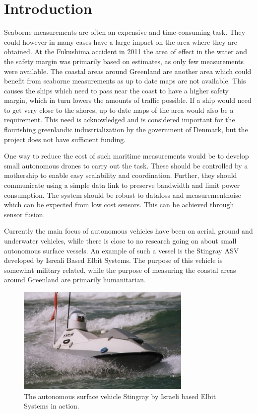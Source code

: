 \documentclass{ifacconf}
\begin{document}
\section{Introduction}
Seaborne measurements are often an expensive and time-consuming task. They could however in many cases have a large impact on the area where they are obtained. At the Fukushima accident in 2011 the area of effect in the water and the safety margin was primarily based on estimates, as only few measurements were available.
The coastal areas around Greenland are another area which could benefit from seaborne measurements as up to date maps are not available. This causes the ships which need to pass near the coast to have a higher safety margin, which in turn lowers the amounts of traffic possible. If a ship would need to get very close to the shores, up to date maps of the area would also be a requirement. This need is acknowledged and is considered important for the flourishing greenlandic industrialization by the government of Denmark, but the project does not have sufficient funding.

One way to reduce the cost of such maritime measurements would be to develop small autonomous drones to carry out the task. These should be controlled by a mothership to enable easy scalability and coordination. Further, they should communicate using a simple data link to preserve bandwidth and limit power consumption. The system should be robust to dataloss and measurementnoise which can be expected from low cost sensors. This can be achieved through sensor fusion.

Currently the main focus of autonomous vehicles have been on aerial, ground and underwater vehicles, while there is close to no research going on about small autonomous surface vessels. An example of such a vessel is the Stingray ASV developed by Isreali Based Elbit Systems. The purpose of this vehicle is somewhat military related, while the purpose of measuring the coastal areas around Greenland are primarily humanitarian.
\begin{figure}
	\begin{center}
		\includegraphics[width=8.4cm]{img/stingray.jpg} %
		\caption{The autonomous surface vehicle Stingray by Israeli based Elbit Systems in action.}  
		\label{fig:stingray}
	\end{center}
\end{figure}
\end{document}
